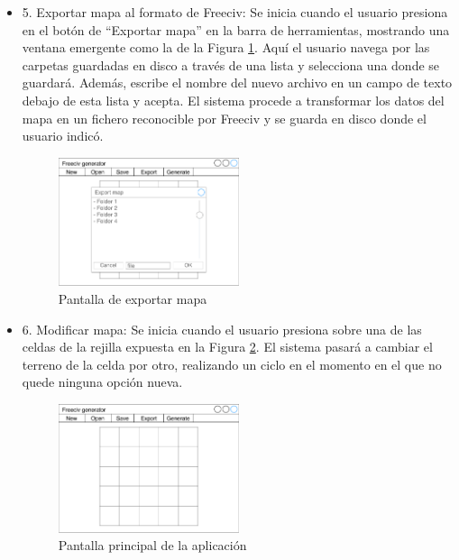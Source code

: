 \begin{itemize}
	\item 5. Exportar mapa al formato de Freeciv: Se inicia cuando el usuario presiona en el botón de ``Exportar mapa'' en la barra de herramientas, mostrando una ventana emergente como la de la Figura \ref{fig:exportmock}. Aquí el usuario navega por las carpetas guardadas en disco a través de una lista y selecciona una donde se guardará. Además, escribe el nombre del nuevo archivo en un campo de texto debajo de esta lista y acepta. El sistema procede a transformar los datos del mapa en un fichero reconocible por Freeciv y se guarda en disco donde el usuario indicó.
	
	\begin{figure}[!h]
		\centering
		\includegraphics[width=0.5\textwidth]{images/export-map.pdf}
		\caption{Pantalla de exportar mapa}
		\label{fig:exportmock}
	\end{figure}
	
	\item 6. Modificar mapa: Se inicia cuando el usuario presiona sobre una de las celdas de la rejilla expuesta en la Figura \ref{fig:mainmock}. El sistema pasará a cambiar el terreno de la celda por otro, realizando un ciclo en el momento en el que no quede ninguna opción nueva.
	
	\begin{figure}[!h]
		\centering
		\includegraphics[width=0.5\textwidth]{images/aplicacion.pdf}
		\caption{Pantalla principal de la aplicación}
		\label{fig:mainmock}
	\end{figure}

\end{itemize}

